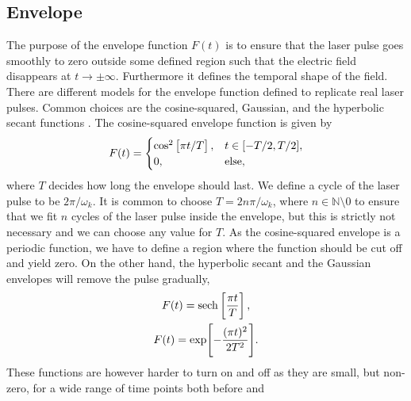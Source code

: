         \subsection{Envelope}
            \label{subsec:envelope}
            The purpose of the envelope function $F(t)$ is to ensure that the
            laser pulse goes smoothly to zero outside some defined region such
            that the electric field disappears at $t \to \pm \infty$.
            Furthermore it defines the temporal shape of the field.
            There are different models for the envelope function defined to
            replicate real laser pulses.
            Common choices are the cosine-squared, Gaussian, and the hyperbolic
            secant functions \cite{joachain2012atoms}.
            The cosine-squared envelope function is given by
            \begin{gather}
                F(t) = \begin{cases}
                    \cos^2\left[ 
                        \pi t / T
                     \right], & t \in [-T / 2, T / 2], \\
                    0, & \text{else},
                \end{cases}
            \end{gather}
            where $T$ decides how long the envelope should last.
            We define a cycle of the laser pulse to be $2\pi/\omega_k$.
            It is common to choose $T = 2n\pi/\omega_k$, where $n \in
            \mathbb{N}\setminus{0}$ to ensure that we fit $n$ cycles of the
            laser pulse inside the envelope, but this is strictly not necessary
            and we can choose any value for $T$.
            As the cosine-squared envelope is a periodic function, we have to
            define a region where the function should be cut off and yield zero.
            On the other hand, the hyperbolic secant and the Gaussian envelopes
            will remove the pulse gradually,
            \begin{gather}
                F(t) = \sech\brak{
                    \frac{\pi t}{T}
                }, \\
                F(t) = \exp[
                    -\frac{(\pi t)^2}{2T^2}
                ].
            \end{gather}
            These functions are however harder to turn on and off as they are
            small, but non-zero, for a wide range of time points both before and
